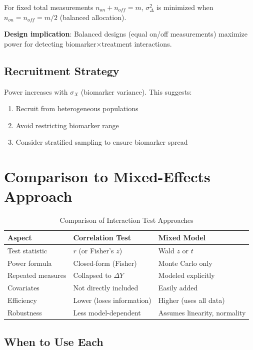 \documentclass[11pt]{article}
\theoremstyle{definition}
\begin{document}
For fixed total measurements $n_{on} + n_{off} = m$, $\sigma_{\Delta}^2$ is
minimized when $n_{on} = n_{off} = m/2$ (balanced allocation).

\textbf{Design implication}: Balanced designs (equal on/off measurements)
maximize power for detecting biomarker$\times$treatment interactions.

\subsection{Recruitment Strategy}

Power increases with $\sigma_X$ (biomarker variance). This suggests:

\begin{enumerate}
    \item Recruit from heterogeneous populations
    \item Avoid restricting biomarker range
    \item Consider stratified sampling to ensure biomarker spread
\end{enumerate}

\section{Comparison to Mixed-Effects Approach}

\begin{table}[h]
\centering
\caption{Comparison of Interaction Test Approaches}
\begin{tabular}{@{}lll@{}}
\toprule
\textbf{Aspect} & \textbf{Correlation Test} & \textbf{Mixed Model} \\
\midrule
Test statistic & $r$ (or Fisher's $z$) & Wald $z$ or $t$ \\
Power formula & Closed-form (Fisher) & Monte Carlo only \\
Repeated measures & Collapsed to $\Delta Y$ & Modeled explicitly \\
Covariates & Not directly included & Easily added \\
Efficiency & Lower (loses information) & Higher (uses all data) \\
Robustness & Less model-dependent & Assumes linearity, normality \\
\bottomrule
\end{tabular}
\end{table}

\subsection{When to Use Each}
\end{document}

